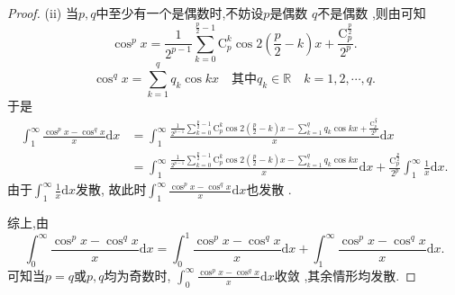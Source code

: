 \documentclass[../../main.tex]{subfiles}%
\begin{document}
\begin{proof}
(ii) 当$p,q$中至少有一个是偶数时,不妨设$p$是偶数 $q$不是偶数 ,则由可知  
\[
\cos ^px=\frac{1}{2^{p-1}}\sum_{k=0}^{\frac{p}{2}-1}{\mathrm{C}_{p}^{k}\cos 2\left( \frac{p}{2}-k \right) x}+\frac{\mathrm{C}_{p}^{\frac{p}{2}}}{2^p}.
\]  
\[
\cos ^qx=\sum_{k=1}^q{q_k\cos kx} \quad \text{其中}q_k\in \mathbb{R} \quad k=1,2,\cdots,q.
\] 
于是
\begin{align*}
\int_1^{\infty}{\frac{\cos ^px-\cos ^qx}{x}\mathrm{d}x}&=\int_1^{\infty}{\frac{\frac{1}{2^{p-1}}\sum\limits_{k=0}^{\frac{p}{2}-1}{\mathrm{C}_{p}^{k}\cos 2\left( \frac{p}{2}-k \right) x}-\sum\limits_{k=1}^q{q_k\cos kx}+\frac{\mathrm{C}_{p}^{\frac{p}{2}}}{2^p}}{x}\mathrm{d}x}\\
&=\int_1^{\infty}{\frac{\frac{1}{2^{p-1}}\sum\limits_{k=0}^{\frac{p}{2}-1}{\mathrm{C}_{p}^{k}\cos 2\left( \frac{p}{2}-k \right) x}-\sum\limits_{k=1}^q{q_k\cos kx}}{x}\mathrm{d}x}+\frac{\mathrm{C}_{p}^{\frac{p}{2}}}{2^p}\int_1^{\infty}{\frac{1}{x}\mathrm{d}x}.
\end{align*}  
由于$\int_1^{\infty}{\frac{1}{x}\mathrm{d}x}$发散, 故此时$\int_1^{\infty}{\frac{\cos ^px-\cos ^qx}{x}\mathrm{d}x}$也发散  .

综上,由  
\[
\int_0^{\infty}{\frac{\cos ^px-\cos ^qx}{x}\mathrm{d}x}=\int_0^1{\frac{\cos ^px-\cos ^qx}{x}\mathrm{d}x}+\int_1^{\infty}{\frac{\cos ^px-\cos ^qx}{x}\mathrm{d}x}.
\]
可知当$p=q$或$p,q$均为奇数时, $\int_0^{\infty}{\frac{\cos ^px-\cos ^qx}{x}\mathrm{d}x}$收敛 ,其余情形均发散.
\end{proof}
\end{document}
